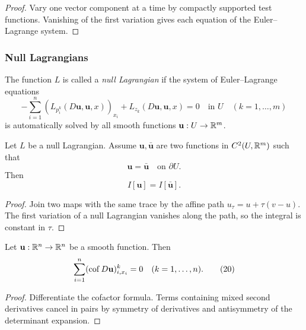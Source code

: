 \begin{proof}
\sketch Vary one vector component at a time by compactly supported test functions. Vanishing of the first variation gives each equation of the Euler--Lagrange system.
\end{proof}

\subsubsection{Null Lagrangians}

\begin{definition}
\label{def:null-lagrangian}

The function $L$ is called a \textit{null Lagrangian} if the system of Euler--Lagrange equations
\[
-\sum_{i=1}^{n} (L_{p_i^k}(D\mathbf{u}, \mathbf{u}, x))_{x_i} + L_{z_k}(D\mathbf{u}, \mathbf{u}, x) = 0 \quad \text{in } U \quad (k = 1, \ldots, m)
\tag{17}
\]
is automatically solved by all smooth functions $\mathbf{u} : U \to \mathbb{R}^m$.
\end{definition}

\begin{theorem}
\label{thm:null-lagrangians-boundary-conditions}

Let $L$ be a null Lagrangian. Assume $\mathbf{u}, \bar{\mathbf{u}}$ are two functions in $C^2(U, \mathbb{R}^m)$ such that
\[
\mathbf{u} = \bar{\mathbf{u}} \quad \text{on } \partial U .
\tag{18}
\]
Then
\[
I[\mathbf{u}] = I[\bar{\mathbf{u}}] .
\tag{19}
\]
\end{theorem}

\begin{proof}
\sketch Join two maps with the same trace by the affine path $u_\tau=u+\tau(v-u)$. The first variation of a null Lagrangian vanishes along the path, so the integral is constant in $\tau$.
\end{proof}

\begin{lemma}
\label{lem:cofactor-divergence-free}
Let $\mathbf{u} : \mathbb{R}^n \to \mathbb{R}^n$ be a smooth function. Then
\[
\sum_{i=1}^n (\operatorname{cof} D\mathbf{u})^k_{i,x_i} = 0 \quad (k = 1, \ldots, n).
\tag{20}
\]
\end{lemma}

\begin{proof}
\sketch Differentiate the cofactor formula. Terms containing mixed second derivatives cancel in pairs by symmetry of derivatives and antisymmetry of the determinant expansion.
\end{proof}

